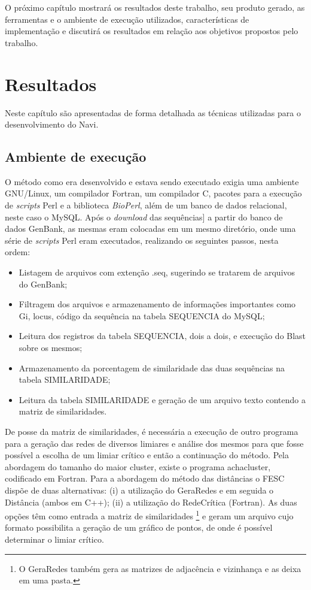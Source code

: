 O próximo capítulo mostrará os resultados deste trabalho, seu produto gerado, as ferramentas e o ambiente de execução utilizados, características
de implementação e discutirá os resultados em relação aos objetivos propostos pelo trabalho.

\chapter{Resultados}
\label{cap:resultados}

Neste capítulo são apresentadas de forma detalhada as técnicas utilizadas para o desenvolvimento do Navi.


\section{Ambiente de execução} \label{sec:ambiente}

O método como era desenvolvido e estava sendo executado exigia uma ambiente GNU/Linux, um compilador Fortran, um compilador C, pacotes para a execução
de \textit{scripts} Perl e a biblioteca \textit{BioPerl}, além de um banco de dados relacional, neste caso o MySQL. Após o \textit{download} das sequências]
a partir do banco de dados GenBank, as mesmas eram colocadas em um mesmo diretório, onde uma série de \textit{scripts} Perl eram executados, realizando os
seguintes passos, nesta ordem:

\begin{itemize}
  \item{Listagem de arquivos com extenção .seq, sugerindo se tratarem de arquivos do GenBank;}
  \item{Filtragem dos arquivos e armazenamento de informações importantes como Gi, locus, código da sequência na tabela SEQUENCIA do MySQL;}
  \item{Leitura dos registros da tabela SEQUENCIA, dois a dois, e execução do Blast sobre os mesmos;}
  \item{Armazenamento da porcentagem de similaridade das duas sequências na tabela SIMILARIDADE;}
  \item{Leitura da tabela SIMILARIDADE e geração de um arquivo texto contendo a matriz de similaridades.}
\end{itemize}

De posse da matriz de similaridades, é necessária a execução de outro programa para a geração das redes de diversos limiares e análise dos mesmos para que
fosse possível a escolha de um limiar crítico e então a continuação do método. Pela abordagem do tamanho do maior cluster, existe o programa achacluster,
codificado em Fortran. Para a abordagem do método das distâncias o FESC dispõe de duas alternativas: (i) a utilização do GeraRedes e em seguida o
Distância (ambos em C++); (ii) a utilização do RedeCrítica (Fortran). As duas opções têm como entrada a matriz de similaridades \footnote{O GeraRedes 
também gera as matrizes de adjacência e vizinhança e as deixa em uma pasta.} e geram um arquivo cujo formato possibilita a geração de um gráfico de pontos,
de onde é possível determinar o limiar crítico.

